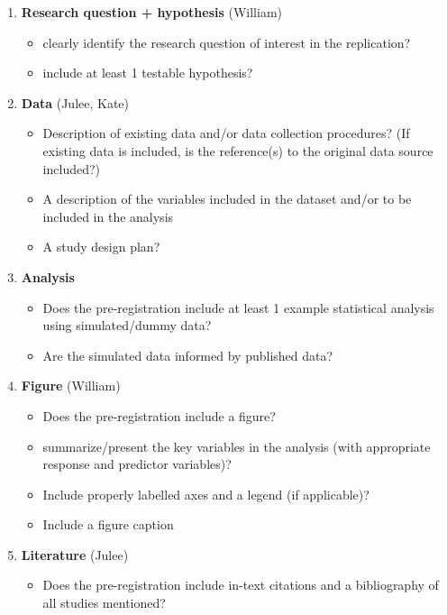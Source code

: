 \documentclass[]{article}
\providecommand{\tightlist}{%
\setlength{\itemsep}{0pt}\setlength{\parskip}{0pt}}
\newcounter{question}
\begin{document}
\begin{enumerate}
\def\labelenumi{\arabic{enumi}.}
\item
  \textbf{Research question + hypothesis} (William)

  \begin{itemize}
  \item
    clearly identify the research question of interest in the
    replication?
  \item
    include at least 1 testable hypothesis?
  \end{itemize}
\item
  \textbf{Data} (Julee, Kate)

  \begin{itemize}
  \item
    Description of existing data and/or data collection procedures? (If
    existing data is included, is the reference(s) to the original data
    source included?)
  \item
    A description of the variables included in the dataset and/or to be
    included in the analysis
  \item
    A study design plan?
  \end{itemize}
\item
  \textbf{Analysis}

  \begin{itemize}
  \item
    Does the pre-registration include at least 1 example statistical
    analysis using simulated/dummy data?
  \item
    Are the simulated data informed by published data?
  \end{itemize}
\item
  \textbf{Figure} (William)

  \begin{itemize}
  \item
    Does the pre-registration include a figure?
  \item
    summarize/present the key variables in the analysis (with
    appropriate response and predictor variables)?
  \item
    Include properly labelled axes and a legend (if applicable)?
  \item
    Include a figure caption
  \end{itemize}
\item
  \textbf{Literature} (Julee)

  \begin{itemize}
  \tightlist
  \item
    Does the pre-registration include in-text citations and a
    bibliography of all studies mentioned?
  \end{itemize}
\end{enumerate}
\end{document}
